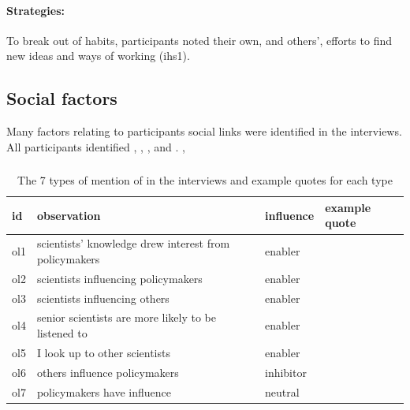 \paragraph{Strategies:}
To break out of habits, participants noted their own, and others', efforts to find new ideas and ways of working (ihs1).
 
\subsection{Social factors}\label{sec:ressocial}

Many factors relating to participants social links were identified in the interviews. All participants identified \ismso, \ismsi, \ismsr, \ismsm{} and \ismsnr{}. ,  

\subsubsection{\ismso}\label{sec:resopinionleaders}

\begin{table}[!ht]
\footnotesize
\caption{The 7 types of mention of \ismso{} in the interviews and example quotes for each type}\label{tab:resopinionleaders}
\begin{tabular}{L{.06\linewidth}L{.3\linewidth}L{.12\linewidth}L{.52\linewidth}} \hline 
\textbf{id} & \textbf{observation} & \textbf{influence} & \textbf{example quote} \\ \hline \hline 
ol1 & scientists' knowledge   drew interest from policymakers & enabler &   \\[5mm]
ol2 & scientists influencing policymakers & enabler &   \\[5mm]
ol3 & scientists influencing others & enabler &  \\[5mm]
ol4 & senior scientists are more likely to be   listened to & enabler &  \\[5mm]
ol5 & I look up to other scientists & enabler &  \\[5mm]
ol6 & others influence policymakers & inhibitor &  \\[5mm]
ol7 & policymakers have influence & neutral &  \\[5mm] \hline
\end{tabular}
\end{table}

